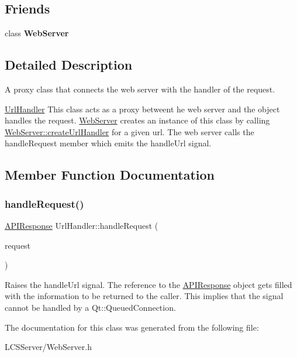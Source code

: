 \subsection*{Friends}
\begin{DoxyCompactItemize}
\item 
\mbox{\label{class_url_handler_abdf165e971bc8503e8fcdb3267df5a36}} 
class {\bfseries Web\+Server}
\end{DoxyCompactItemize}


\subsection{Detailed Description}
A proxy class that connects the web server with the handler of the request. 

\hyperlink{class_url_handler}{Url\+Handler} This class acts as a proxy betweent he web server and the object handles the request. \hyperlink{class_web_server}{Web\+Server} creates an instance of this class by calling \hyperlink{class_web_server_a991ba62e7d4044e2f85fe1457aa5bad4}{Web\+Server\+::create\+Url\+Handler} for a given url. The web server calls the handle\+Request member which emits the handle\+Url signal. 

\subsection{Member Function Documentation}
\mbox{\label{class_url_handler_a2c3f0bc7731a1eb5d732378c3c876043}} 
\subsubsection{\texorpdfstring{handle\+Request()}{handleRequest()}}
{\footnotesize\ttfamily \hyperlink{class_a_p_i_response}{A\+P\+I\+Response} Url\+Handler\+::handle\+Request (\begin{DoxyParamCaption}\item[{const \hyperlink{class_a_p_i_request}{A\+P\+I\+Request} \&}]{request }\end{DoxyParamCaption})\hspace{0.3cm}{\ttfamily [inline]}}

Raises the handle\+Url signal. The reference to the \hyperlink{class_a_p_i_response}{A\+P\+I\+Response} object gets filled with the information to be returned to the caller. This implies that the signal cannot be handled by a Qt\+::\+Queued\+Connection. 

The documentation for this class was generated from the following file\+:\begin{DoxyCompactItemize}
\item 
L\+C\+S\+Server/Web\+Server.\+h\end{DoxyCompactItemize}

